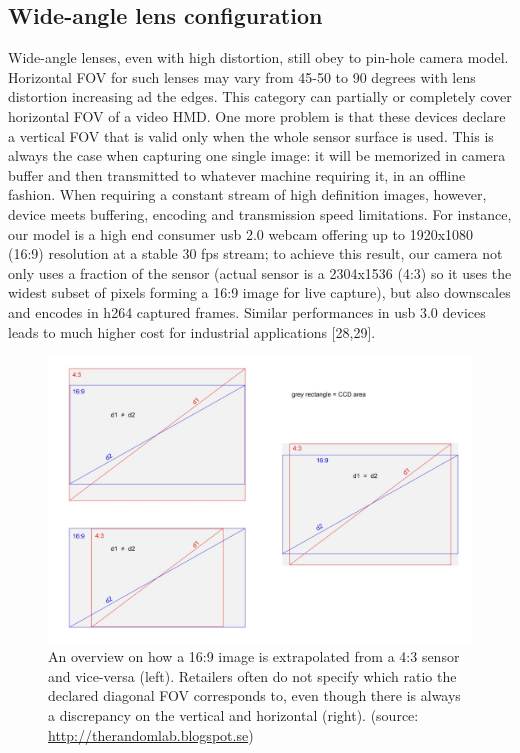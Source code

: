 \subsection{Wide-angle lens configuration}
Wide-angle lenses, even with high distortion, still obey to pin-hole camera model. Horizontal FOV for such lenses may vary from 45-50 to 90 degrees with lens distortion increasing ad the edges. This category can partially or completely cover horizontal FOV of a video HMD. One more problem is that these devices declare a vertical FOV that is valid only when the whole sensor surface is used. This is always the case when capturing one single image: it will be memorized in camera buffer and then transmitted to whatever machine requiring it, in an offline fashion. When requiring a constant stream of high definition images, however, device meets buffering, encoding and transmission speed limitations. For instance, our model is a high end consumer usb 2.0 webcam offering up to 1920x1080 (16:9) resolution at a stable 30 fps stream; to achieve this result, our camera not only uses a fraction of the sensor (actual sensor is a 2304x1536 (4:3) so it uses the widest subset of pixels forming a 16:9 image for live capture), but also downscales and encodes in h264 captured frames. Similar performances in usb 3.0 devices leads to much higher cost for industrial applications [28,29].

\begin{figure}
\centering
\includegraphics[width=\linewidth]{schemas/diagonal_FOV}
\caption{An overview on how a 16:9 image is extrapolated from a 4:3 sensor and vice-versa (left). Retailers often do not specify which ratio the declared diagonal FOV corresponds to, even though there is always a discrepancy on the vertical and horizontal (right). (source: \href{http://therandomlab.blogspot.se/2013/03/logitech-c920-and-c910-fields-of-view.html}{http://therandomlab.blogspot.se})}
\label{fig:timewarp_timeline}
\end{figure}

